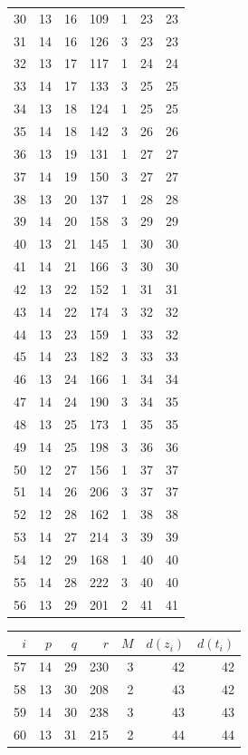 \documentclass[11pt,a4paper]{article}
\theoremstyle{definition}
\theoremstyle{remark}
\begin{document}
\begin{center}
\begin{tabular}{@{}rrrrrrr@{}}
30 & 13 & 16 & 109 & 1 & 23 & 23 \\
31 & 14 & 16 & 126 & 3 & 23 & 23 \\
32 & 13 & 17 & 117 & 1 & 24 & 24 \\
33 & 14 & 17 & 133 & 3 & 25 & 25 \\
34 & 13 & 18 & 124 & 1 & 25 & 25 \\
35 & 14 & 18 & 142 & 3 & 26 & 26 \\
36 & 13 & 19 & 131 & 1 & 27 & 27 \\
37 & 14 & 19 & 150 & 3 & 27 & 27 \\
38 & 13 & 20 & 137 & 1 & 28 & 28 \\
39 & 14 & 20 & 158 & 3 & 29 & 29 \\
40 & 13 & 21 & 145 & 1 & 30 & 30 \\
41 & 14 & 21 & 166 & 3 & 30 & 30 \\
42 & 13 & 22 & 152 & 1 & 31 & 31 \\
43 & 14 & 22 & 174 & 3 & 32 & 32 \\
44 & 13 & 23 & 159 & 1 & 33 & 32 \\
45 & 14 & 23 & 182 & 3 & 33 & 33 \\
46 & 13 & 24 & 166 & 1 & 34 & 34 \\
47 & 14 & 24 & 190 & 3 & 34 & 35 \\
48 & 13 & 25 & 173 & 1 & 35 & 35 \\
49 & 14 & 25 & 198 & 3 & 36 & 36 \\
50 & 12 & 27 & 156 & 1 & 37 & 37 \\
51 & 14 & 26 & 206 & 3 & 37 & 37 \\
52 & 12 & 28 & 162 & 1 & 38 & 38 \\
53 & 14 & 27 & 214 & 3 & 39 & 39 \\
54 & 12 & 29 & 168 & 1 & 40 & 40 \\
55 & 14 & 28 & 222 & 3 & 40 & 40 \\
56 & 13 & 29 & 201 & 2 & 41 & 41 \\
\bottomrule
\end{tabular}\hfill
\begin{tabular}{@{}rrrrrrr@{}}
\toprule
$i$ & $p$ & $q$ & $r$ & $M$ & $d(z_i)$ & $d(t_i)$ \\
\midrule
57 & 14 & 29 & 230 & 3 & 42 & 42 \\
58 & 13 & 30 & 208 & 2 & 43 & 42 \\
59 & 14 & 30 & 238 & 3 & 43 & 43 \\
60 & 13 & 31 & 215 & 2 & 44 & 44 \\

\end{tabular}
\end{center}
\end{document}
